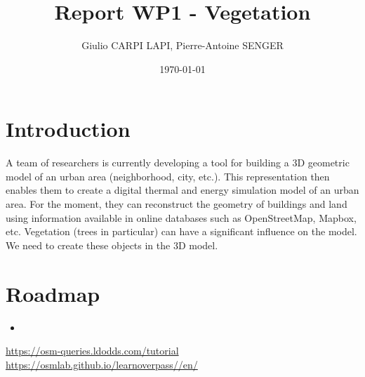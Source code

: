 \documentclass[11pt]{article}
\begin{document}
\title{Report WP1 - Vegetation}
\author{Giulio CARPI LAPI, Pierre-Antoine SENGER}
\date{\today}
\maketitle

\section{Introduction}

A team of researchers is currently developing a tool for building a 3D geometric model of an urban area (neighborhood, city, etc.).
This representation then enables them to create a digital thermal and energy simulation model of an urban area.
For the moment, they can reconstruct the geometry of buildings and land using information available in online databases such as OpenStreetMap, Mapbox, etc.
Vegetation (trees in particular) can have a significant influence on the model. We need to create these objects in the 3D model.

\section{Roadmap}
\begin{itemize}
	\item 
\end{itemize}

\begin{thebibliography}{9}
	 \url{https://osm-queries.ldodds.com/tutorial}
	 \url{https://osmlab.github.io/learnoverpass//en/}

\end{thebibliography}
\end{document}
